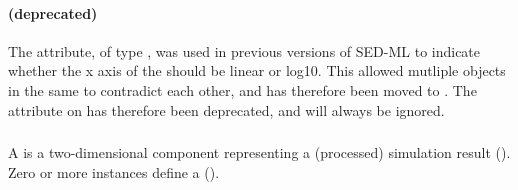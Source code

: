 \begin{blockChanged}
\paragraph*{ (deprecated)}
The  attribute, of type , was used in previous versions of SED-ML to indicate whether the x axis of the \Plot should be linear or log10.  This allowed mutliple \Curve objects in the same \Plot to contradict each other, and has therefore been moved to \Axis.  The  attribute on \Curve has therefore been deprecated, and will always be ignored.

\end{blockChanged}


\subsubsection{}
\label{class:curve}
A \Curve is a two-dimensional \Output component representing a (processed) simulation result (). Zero or more \Curve instances define a \PlotTwo (). 


